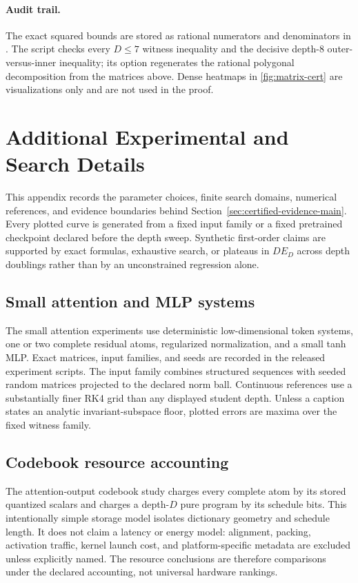 \documentclass[twoside,11pt]{article}
\begin{document}
\paragraph{Audit trail.}
The exact squared bounds are stored as rational numerators and denominators in .  The script  checks every $D\le7$ witness inequality and the decisive depth-$8$ outer-versus-inner inequality; its  option regenerates the rational polygonal decomposition from the matrices above.  Dense heatmaps in \cref{fig:matrix-cert} are visualizations only and are not used in the proof.



\section{Additional Experimental and Search Details}
\label{app:experiments}

This appendix records the parameter choices, finite search domains, numerical
references, and evidence boundaries behind Section~\ref{sec:certified-evidence-main}.
Every plotted curve is generated from a fixed input family or a fixed
pretrained checkpoint declared before the depth sweep.  Synthetic first-order
claims are supported by exact formulas, exhaustive search, or plateaus in
$DE_D$ across depth doublings rather than by an unconstrained regression alone.

\subsection{Small attention and MLP systems}
The small attention experiments use deterministic low-dimensional token
systems, one or two complete residual atoms, regularized normalization, and a
small tanh MLP.  Exact matrices, input families, and seeds are recorded in the
released experiment scripts.  The input family combines structured sequences
with seeded random matrices projected to the declared norm ball.  Continuous
references use a substantially finer RK4 grid than any displayed student
depth.  Unless a caption states an analytic invariant-subspace floor, plotted
errors are maxima over the fixed witness family.

\subsection{Codebook resource accounting}
The attention-output codebook study charges every complete atom by its stored
quantized scalars and charges a depth-$D$ pure program by its schedule bits.
This intentionally simple storage model isolates dictionary geometry and
schedule length.  It does not claim a latency or energy model: alignment,
packing, activation traffic, kernel launch cost, and platform-specific
metadata are excluded unless explicitly named.  The resource conclusions are
therefore comparisons under the declared accounting, not universal hardware
rankings.
\end{document}

